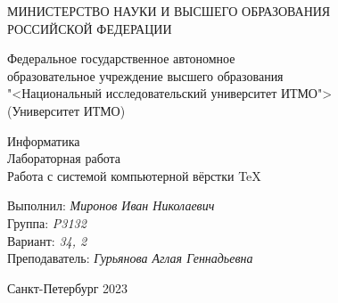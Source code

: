 \thispagestyle{empty}

\begin{center}
    МИНИСТЕРСТВО НАУКИ И ВЫСШЕГО ОБРАЗОВАНИЯ \\ РОССИЙСКОЙ ФЕДЕРАЦИИ

    \vspace{20pt}

    Федеральное государственное автономное \\ образовательное учреждение высшего образования \\
    "<Национальный исследовательский университет ИТМО"> \\
    (Университет ИТМО)

    \vspace{20pt} 
\end{center}

\vfill

\begin{center}
	\Large Информатика\\
	\Large Лабораторная работа \\
	\Large Работа с системой компьютерной вёрстки \TeX
\end{center}

\vfill

\noindent Выполнил: \hfill \textit{Миронов Иван Николаевич}\\
\noindent Группа: \hfill \textit{P3132}\\
\noindent Вариант: \hfill \textit{34, 2}\\

\noindent Преподаватель: \hfill \textit{Гурьянова Аглая Геннадьевна}

\vfill

\begin{center}
    Санкт-Петербург 2023
\end{center}

